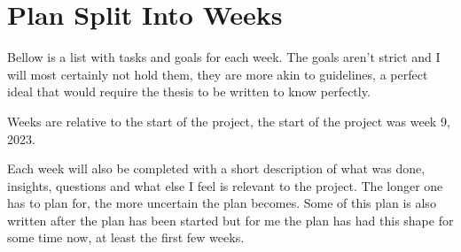 \documentclass[msc,lith,english]{liuthesis}
\begin{document}
\newpage
\section{Plan Split Into Weeks}
Bellow is a list with tasks and goals for each week. The goals aren't strict and I will most certainly not hold them, they are more akin to guidelines, a perfect ideal that would require the thesis to be written to know perfectly. 

Weeks are relative to the start of the project, the start of the project was week 9, 2023.

Each week will also be completed with a short description of what was done, insights, questions and what else I feel is relevant to the project. The longer one has to plan for, the more uncertain the plan becomes. Some of this plan is also written after the plan has been started but for me the plan has had this shape for some time now, at least the first few weeks.

\newcommand{\past}[0]{\textbf{Done:}\hspace{0.2em}}
\newcommand{\curr}[0]{\textbf{\MVRightarrow}\hspace{0.2em}}
\newcommand{\futr}[0]{\textbf{Future:}\hspace{0.2em}}
\newcommand{\presentable}[1]{\newline{}\textbf{Presentable:}\hspace{0.2em}#1}
\end{document}
